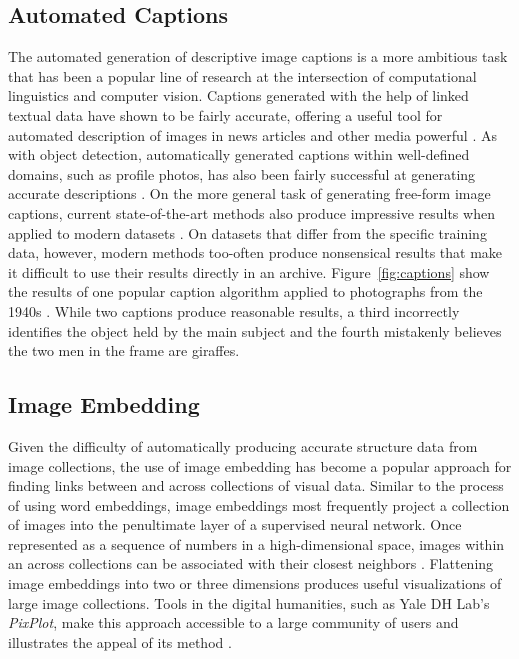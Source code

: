 \documentclass[10pt, a4paper]{article}
\begin{document}
\subsection{Automated Captions}

The automated generation of descriptive image captions is a more ambitious task
that has been a popular line of research at the intersection of computational
linguistics and computer vision. Captions generated with the help of linked
textual data have shown to be fairly accurate, offering a useful tool for
automated description of images in news articles and other media  powerful
\cite{hessel-etal-2019-unsupervised} \cite{BATRA18.725} \cite{HOLLINK16.19}.
As with object detection, automatically generated
captions within well-defined domains, such as profile photos, has also been
fairly successful at generating accurate descriptions \cite{GATT18.226}.
On the more general task of generating free-form image captions, current
state-of-the-art methods also produce impressive results when applied to
modern datasets \cite{nikolaus-etal-2019-compositional} \cite{jiang-etal-2019-reo}
\cite{wang-etal-2018-object}. On datasets that differ from the specific training data,
however, modern methods too-often produce nonsensical results that make it
difficult to use their results directly in an archive. Figure~\ref{fig:captions}
show the results of one popular caption algorithm applied to photographs from
the 1940s \cite{xu2015show}. While two captions produce reasonable results, a
third incorrectly identifies the object held by the main subject and the fourth
mistakenly believes the two men in the frame are giraffes.

\subsection{Image Embedding}

Given the difficulty of automatically producing accurate structure data from
image collections, the use of image embedding has become a popular approach
for finding links between and across collections of visual data. Similar to
the process of using word embeddings, image embeddings most frequently project
a collection of images into the penultimate layer of a supervised neural
network. Once represented as a sequence of numbers in a high-dimensional space,
images within an across collections can be associated with their closest
neighbors \cite{mcauley2015image}. Flattening image embeddings into two or three dimensions
produces useful visualizations of large image collections. Tools in the digital
humanities, such as Yale DH Lab's \textit{PixPlot}, make this approach
accessible to a large community of users and illustrates the appeal of its
method \cite{pixplot}.
\end{document}
